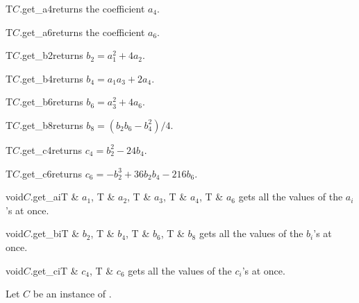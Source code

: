 \begin{cfcode}{T}{$C$.get_a4}{}returns the coefficient $a_4$.
\end{cfcode}

\begin{cfcode}{T}{$C$.get_a6}{}returns the coefficient $a_6$.
\end{cfcode}

\begin{cfcode}{T}{$C$.get_b2}{}returns $b_2 = a_1^2 + 4 a_2$.
\end{cfcode}

\begin{cfcode}{T}{$C$.get_b4}{}returns $b_4 = a_1 a_3 + 2 a_4$.
\end{cfcode}

\begin{cfcode}{T}{$C$.get_b6}{}returns $b_6 = a_3^2 + 4 a_6$.
\end{cfcode}

\begin{cfcode}{T}{$C$.get_b8}{}returns $b_8 = (b_2 b_6 - b_4^2)/4$.
\end{cfcode}

\begin{cfcode}{T}{$C$.get_c4}{}returns $c_4 = b_2^2 - 24 b_4$.
\end{cfcode}

\begin{cfcode}{T}{$C$.get_c6}{}returns $c_6 = -b_2^3+ 36 b_2 b_4 - 216 b_6$.
\end{cfcode}

\begin{cfcode}{void}{$C$.get_ai}{T & $a_1$, T & $a_2$, T & $a_3$, T & $a_4$, T & $a_6$}
  gets all the values of the $a_i$'s at once.
\end{cfcode}

\begin{cfcode}{void}{$C$.get_bi}{T & $b_2$, T & $b_4$, T & $b_6$, T & $b_8$}
  gets all the values of the $b_i$'s at once.
\end{cfcode}

\begin{cfcode}{void}{$C$.get_ci}{T & $c_4$, T & $c_6$}
  gets all the values of the $c_i$'s at once.
\end{cfcode}



\HIGH

Let $C$ be an instance of .

